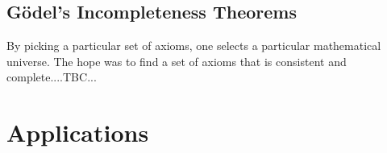 








\subsection{Gödel's Incompleteness Theorems}
By picking a particular set of axioms, one selects a particular mathematical universe. The hope was to find a set of axioms that is consistent and complete....TBC...






\section{Applications}


